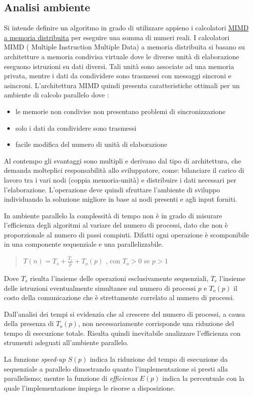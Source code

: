 \documentclass[a4paper,11pt]{book}
\begin{document}
\subsection{Analisi ambiente}
Si intende definire un algoritmo in grado di utilizzare appieno i calcolatori \underline{MIMD a memoria distribuita} per eseguire una somma di numeri reali. I calcolatori MIMD ( Multiple Instruction Multiple Data) a memoria distribuita si basano su architetture a memoria condivisa virtuale dove le diverse unità di elaborazione eseguono istruzioni su dati diversi. Tali unità sono associate ad una memoria privata, mentre i dati da condividere sono trasmessi con messaggi sincroni e asincroni. L'architettura MIMD quindi presenta caratteristiche ottimali per un ambiente di calcolo parallelo dove : 
\begin{itemize}
    \item le memorie non condivise non presentano problemi di sincronizzazione
    \item solo i dati da condividere sono trasmessi
    \item facile modifica del numero di unità di elaborazione
\end{itemize}
Al contempo gli svantaggi sono multipli e derivano dal tipo di architettura, che demanda molteplici responsabilità allo sviluppatore, come: bilanciare il carico di lavoro tra i vari nodi (coppia memoria-unità) e distribuire i dati necessari per l'elaborazione. 
L'operazione deve quindi sfruttare l'ambiente di sviluppo individuando la soluzione migliore in base ai nodi presenti e agli input forniti. \par 
In ambiente parallelo la complessità di tempo non è in grado di misurare l'efficienza degli algoritmi al variare del numero di processi, dato che non è proporzionale al numero di passi compiuti. Difatti ogni operazione è scomponibile in una componente sequenziale e una parallelizzabile.
\begin{quote}
    \centering
    $T(n) = T_s + \frac{T_c}{p}+ T_o(p)$ , con $T_o > 0$ se $p > 1$
\end{quote}
Dove $T_s$ risulta l'insieme delle operazioni esclusivamente sequenziali, $T_c$ l'insieme delle istruzioni eventualmente simultanee sul numero di processi $p$ e $T_o(p)$ il costo della comunicazione che è strettamente correlato al numero di processi. \par 
Dall'analisi dei tempi si evidenzia che al crescere del numero di processi, a causa della presenza di $T_o(p)$, non necessariamente corrisponde una riduzione del tempo di esecuzione totale. Risulta quindi inevitabile analizzare l'efficienza con strumenti adeguati all'ambiente parallelo.\par 
La funzione \textit{speed-up} $S(p)$ indica la riduzione del tempo di esecuzione da sequenziale a parallelo dimostrando quanto l'implementazione si presti alla parallelismo; mentre la funzione di \textit{efficienza} $E(p)$ indica la percentuale con la quale l'implementazione impiega le risorse a disposizione.
\end{document}
